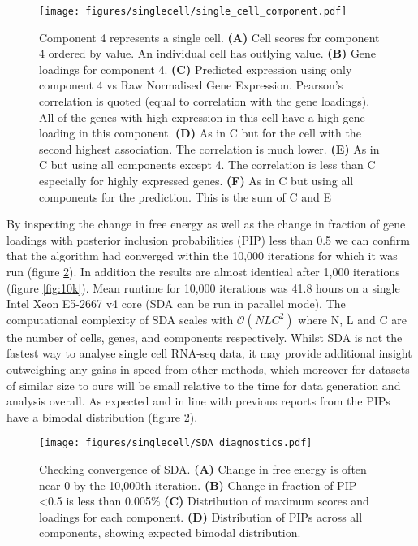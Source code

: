 \begin{figure}[H]
	\centering
	\texttt{[image: figures/singlecell/single\_cell\_component.pdf]}
	\caption[A Single Cell Component]{Component 4 represents a single cell.
		\textbf{(A)} Cell scores for component 4 ordered by value.
			An individual cell has outlying value.
		\textbf{(B)} Gene loadings for component 4.
		\textbf{(C)} Predicted expression using only component 4 vs Raw Normalised Gene Expression.
			Pearson's correlation is quoted (equal to correlation with the gene loadings).
			All of the genes with high expression in this cell have a high gene loading in this component.
		\textbf{(D)} As in C but for the cell with the second highest association.
			The correlation is much lower.
		\textbf{(E)} As in C but using all components except 4.
			The correlation is less than C especially for highly expressed genes.
		\textbf{(F)} As in C but using all components for the prediction.
			This is the sum of C and E
	}
	\label{fig:single_cell_component}
\end{figure}


By inspecting the change in free energy as well as the change in fraction of gene loadings with posterior inclusion probabilities (PIP) less than 0.5 we can confirm that the algorithm had converged within the 10,000 iterations for which it was run (figure \ref{fig:SDA_diagnostics}).
In addition the results are almost identical after 1,000 iterations (figure \ref{fig:10k}).
Mean runtime for 10,000 iterations was 41.8 hours on a single Intel Xeon E5-2667 v4 core (SDA can be run in parallel mode).
The computational complexity of SDA scales with $\mathcal{O}(NLC^2)$ where N, L and C are the number of cells, genes, and components respectively.
Whilst SDA is not the fastest way to analyse single cell RNA-seq data, it may provide additional insight outweighing any gains in speed from other methods, which moreover for datasets of similar size to ours will be small relative to the time for data generation and analysis overall.
As expected and in line with previous reports from \cite{Hore2016Tensor} the PIPs have a bimodal distribution (figure \ref{fig:SDA_diagnostics}).

\begin{figure}[H]
	\centering
	\texttt{[image: figures/singlecell/SDA\_diagnostics.pdf]}
	\caption[SDA Convergence]{Checking convergence of SDA.
		\textbf{(A)} Change in free energy is often near 0 by the 10,000th iteration.
		\textbf{(B)} Change in fraction of PIP <0.5 is less than 0.005\%
		\textbf{(C)} Distribution of maximum scores and loadings for each component.
		\textbf{(D)} Distribution of PIPs across all components, showing expected bimodal distribution.}
	\label{fig:SDA_diagnostics}
\end{figure}

